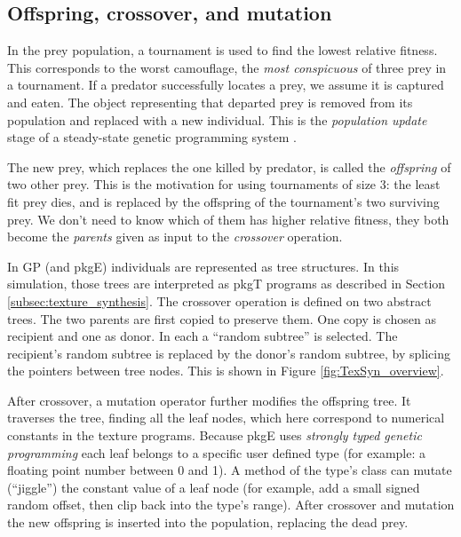 \documentclass[acmtog]{acmart}
\newcommand{\jargon}[1]{\textit{#1}}
\newcommand{\texsyn}[0]{pkgT}
\newcommand{\lazypredator}[0]{pkgE}
\begin{document}

\subsection{Offspring, crossover, and mutation}
In the prey population, a tournament is used to find the lowest relative fitness. This corresponds to the worst camouflage, the \jargon{most conspicuous} of three prey in a tournament. If a predator successfully locates a prey, we assume it is captured and eaten. The object representing that departed prey is removed from its population and replaced with a new individual. This is the \jargon{population update} stage of a steady-state genetic programming system \cite{syswerda_study_1991}.
\par
The new prey, which replaces the one killed by predator, is called the \jargon{offspring} of two other prey. This is the motivation for using tournaments of size 3: the least fit prey dies, and is replaced by the offspring of the tournament's two surviving prey. We don't need to know which of them has higher relative fitness, they both become the \jargon{parents} given as input to the \jargon{crossover} operation.
\par
In GP (and \lazypredator{}) individuals are represented as tree structures. In this simulation, those trees are interpreted as \texsyn{} programs as described in Section \ref{subsec:texture_synthesis}. The crossover operation is defined on two abstract trees. The two parents are first copied to preserve them. One copy is chosen as recipient and one as donor. In each a “random subtree” is selected. The recipient's random subtree is replaced by the donor's random subtree, by splicing the pointers between tree nodes. This is shown in Figure \ref{fig:TexSyn_overview}.
\par
After crossover, a mutation operator further modifies the offspring tree. It traverses the tree, finding all the leaf nodes, which here correspond to numerical constants in the texture programs. Because \lazypredator{} uses \jargon{strongly typed genetic programming} \cite{montana_strongly_1995} each leaf belongs to a specific user defined type (for example: a floating point number between 0 and 1). A method of the type's class can mutate (“jiggle”) the constant value of a leaf node (for example, add a small signed random offset, then clip back into the type's range). After crossover and mutation the new offspring is inserted into the population, replacing the dead prey.
\par
\end{document}
